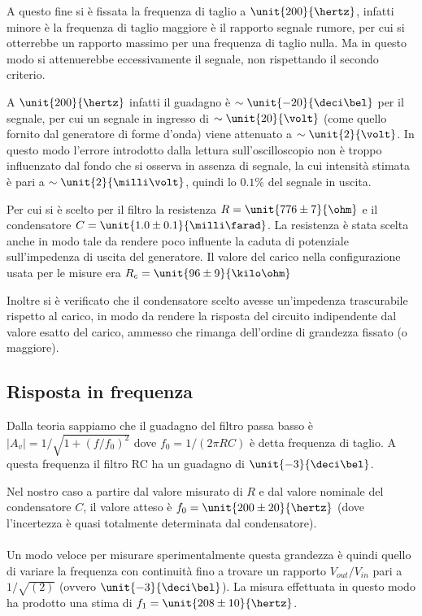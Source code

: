 \documentclass[10pt,a4paper]{article}
\begin{document}
A questo fine si è fissata la frequenza di taglio a $\unit{200}{\hertz}$, infatti minore è la frequenza di taglio maggiore è il rapporto segnale rumore, per cui si otterrebbe un rapporto massimo per una frequenza di taglio nulla. Ma in questo modo si attenuerebbe eccessivamente il segnale, non rispettando il secondo criterio.


A $\unit{200}{\hertz}$ infatti il guadagno è $\sim \unit{-20}{\deci\bel}$ per il segnale, per cui un segnale in ingresso di $\sim \unit{20}{\volt}$ (come quello fornito dal generatore di forme d'onda) viene attenuato a $\sim \unit{2}{\volt}$. In questo modo l'errore introdotto dalla lettura sull'oscilloscopio non è troppo influenzato dal fondo che si osserva in assenza di segnale, la cui intensità stimata è pari a $\sim \unit{2}{\milli\volt}$, quindi lo $0.1\%$ del segnale in uscita.

Per cui si è scelto per il filtro la resistenza $R = \unit{776 \pm 7}{\ohm}$ e il condensatore $C = \unit{1.0 \pm 0.1}{\milli\farad}$. La resistenza è stata scelta anche in modo tale da rendere poco influente la caduta di potenziale sull'impedenza di uscita del generatore. Il valore del carico nella configurazione usata per le misure era $R_{c} = \unit{96 \pm 9}{\kilo\ohm}$

Inoltre si è verificato che il condensatore scelto avesse un'impedenza trascurabile rispetto al carico, in modo da rendere la risposta del circuito indipendente dal valore esatto del carico, ammesso che rimanga dell'ordine di grandezza fissato (o maggiore).

\subsection{Risposta in frequenza}
Dalla teoria sappiamo che il guadagno del filtro passa basso è $|A_v|=1/\sqrt{1+(f/f_0)^2}$ dove $f_0 = 1/(2 \pi RC)$ è detta frequenza di taglio. A questa frequenza il filtro RC ha un guadagno di $\unit{-3}{\deci\bel}$.

Nel nostro caso a partire dal valore misurato di $R$ e dal valore nominale del condensatore $C$, il valore atteso è $f_0 = \unit{200 \pm 20}{\hertz}$ (dove l'incertezza è quasi totalmente determinata dal condensatore).

\paragraph{} Un modo veloce per misurare sperimentalmente questa grandezza è quindi quello di variare la frequenza con continuità fino a trovare  un rapporto $V_{out}/V_{in}$ pari a $1/\sqrt{(2)}$ (ovvero $\unit{-3}{\deci\bel}$). La misura effettuata in questo modo ha prodotto una stima di $f_1 =\unit{208 \pm 10}{\hertz}$.
\end{document}
